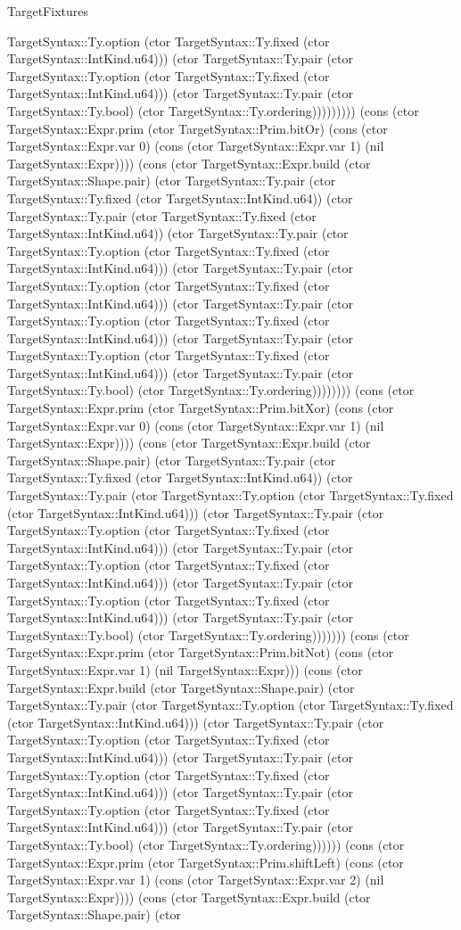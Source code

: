 \begin{lexlean}{TargetFixtures}
\begin{semanticmodule}
{TargetSyntax::Ty.option (ctor TargetSyntax::Ty.fixed (ctor TargetSyntax::IntKind.u64))) (ctor TargetSyntax::Ty.pair (ctor TargetSyntax::Ty.option (ctor TargetSyntax::Ty.fixed (ctor TargetSyntax::IntKind.u64))) (ctor TargetSyntax::Ty.pair (ctor TargetSyntax::Ty.bool) (ctor TargetSyntax::Ty.ordering))))))))) (cons (ctor TargetSyntax::Expr.prim (ctor TargetSyntax::Prim.bitOr) (cons (ctor TargetSyntax::Expr.var 0) (cons (ctor TargetSyntax::Expr.var 1) (nil TargetSyntax::Expr)))) (cons (ctor TargetSyntax::Expr.build (ctor TargetSyntax::Shape.pair) (ctor TargetSyntax::Ty.pair (ctor TargetSyntax::Ty.fixed (ctor TargetSyntax::IntKind.u64)) (ctor TargetSyntax::Ty.pair (ctor TargetSyntax::Ty.fixed (ctor TargetSyntax::IntKind.u64)) (ctor TargetSyntax::Ty.pair (ctor TargetSyntax::Ty.option (ctor TargetSyntax::Ty.fixed (ctor TargetSyntax::IntKind.u64))) (ctor TargetSyntax::Ty.pair (ctor TargetSyntax::Ty.option (ctor TargetSyntax::Ty.fixed (ctor TargetSyntax::IntKind.u64))) (ctor TargetSyntax::Ty.pair (ctor TargetSyntax::Ty.option (ctor TargetSyntax::Ty.fixed (ctor TargetSyntax::IntKind.u64))) (ctor TargetSyntax::Ty.pair (ctor TargetSyntax::Ty.option (ctor TargetSyntax::Ty.fixed (ctor TargetSyntax::IntKind.u64))) (ctor TargetSyntax::Ty.pair (ctor TargetSyntax::Ty.bool) (ctor TargetSyntax::Ty.ordering)))))))) (cons (ctor TargetSyntax::Expr.prim (ctor TargetSyntax::Prim.bitXor) (cons (ctor TargetSyntax::Expr.var 0) (cons (ctor TargetSyntax::Expr.var 1) (nil TargetSyntax::Expr)))) (cons (ctor TargetSyntax::Expr.build (ctor TargetSyntax::Shape.pair) (ctor TargetSyntax::Ty.pair (ctor TargetSyntax::Ty.fixed (ctor TargetSyntax::IntKind.u64)) (ctor TargetSyntax::Ty.pair (ctor TargetSyntax::Ty.option (ctor TargetSyntax::Ty.fixed (ctor TargetSyntax::IntKind.u64))) (ctor TargetSyntax::Ty.pair (ctor TargetSyntax::Ty.option (ctor TargetSyntax::Ty.fixed (ctor TargetSyntax::IntKind.u64))) (ctor TargetSyntax::Ty.pair (ctor TargetSyntax::Ty.option (ctor TargetSyntax::Ty.fixed (ctor TargetSyntax::IntKind.u64))) (ctor TargetSyntax::Ty.pair (ctor TargetSyntax::Ty.option (ctor TargetSyntax::Ty.fixed (ctor TargetSyntax::IntKind.u64))) (ctor TargetSyntax::Ty.pair (ctor TargetSyntax::Ty.bool) (ctor TargetSyntax::Ty.ordering))))))) (cons (ctor TargetSyntax::Expr.prim (ctor TargetSyntax::Prim.bitNot) (cons (ctor TargetSyntax::Expr.var 1) (nil TargetSyntax::Expr))) (cons (ctor TargetSyntax::Expr.build (ctor TargetSyntax::Shape.pair) (ctor TargetSyntax::Ty.pair (ctor TargetSyntax::Ty.option (ctor TargetSyntax::Ty.fixed (ctor TargetSyntax::IntKind.u64))) (ctor TargetSyntax::Ty.pair (ctor TargetSyntax::Ty.option (ctor TargetSyntax::Ty.fixed (ctor TargetSyntax::IntKind.u64))) (ctor TargetSyntax::Ty.pair (ctor TargetSyntax::Ty.option (ctor TargetSyntax::Ty.fixed (ctor TargetSyntax::IntKind.u64))) (ctor TargetSyntax::Ty.pair (ctor TargetSyntax::Ty.option (ctor TargetSyntax::Ty.fixed (ctor TargetSyntax::IntKind.u64))) (ctor TargetSyntax::Ty.pair (ctor TargetSyntax::Ty.bool) (ctor TargetSyntax::Ty.ordering)))))) (cons (ctor TargetSyntax::Expr.prim (ctor TargetSyntax::Prim.shiftLeft) (cons (ctor TargetSyntax::Expr.var 1) (cons (ctor TargetSyntax::Expr.var 2) (nil TargetSyntax::Expr)))) (cons (ctor TargetSyntax::Expr.build (ctor TargetSyntax::Shape.pair) (ctor }
\end{semanticmodule}
\end{lexlean}
